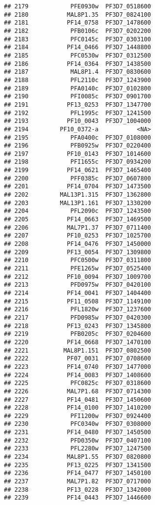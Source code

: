 \documentclass{article}\usepackage[]{graphicx}\usepackage[]{color}
\makeatletter
\newenvironment{kframe}{%
 \def\at@end@of@kframe{}%
 \ifinner\ifhmode%
  \def\at@end@of@kframe{\end{minipage}}%
  \begin{minipage}{\columnwidth}%
 \fi\fi%
 \def\FrameCommand##1{\hskip\@totalleftmargin \hskip-\fboxsep
 \colorbox{shadecolor}{##1}\hskip-\fboxsep
     \hskip-\linewidth \hskip-\@totalleftmargin \hskip\columnwidth}%
 \MakeFramed {\advance\hsize-\width
   \@totalleftmargin\z@ \linewidth\hsize
   \@setminipage}}%
 {\par\unskip\endMakeFramed%
 \at@end@of@kframe}
\newenvironment{knitrout}{}{} %
\makeatother
\begin{document}
\begin{knitrout}
\begin{kframe}
\begin{verbatim}
## 2179            PFE0930w  PF3D7_0518600
## 2180           MAL8P1.35  PF3D7_0824100
## 2181           PF14_0758  PF3D7_1478600
## 2182            PFB0106c  PF3D7_0202200
## 2183            PFC0145c  PF3D7_0303100
## 2184           PF14_0466  PF3D7_1448800
## 2185            PFC0530w  PF3D7_0312500
## 2186           PF14_0364  PF3D7_1438500
## 2187            MAL8P1.4  PF3D7_0830600
## 2188            PFL2110c  PF3D7_1243900
## 2189            PFA0140c  PF3D7_0102800
## 2190            PFI0085c  PF3D7_0901700
## 2191           PF13_0253  PF3D7_1347700
## 2192            PFL1995c  PF3D7_1241500
## 2193           PF10_0043  PF3D7_1004000
## 2194         PF10_0372-a           <NA>
## 2195            PFA0400c  PF3D7_0108000
## 2196            PFB0925w  PF3D7_0220400
## 2197           PF10_0143  PF3D7_1014600
## 2198            PFI1655c  PF3D7_0934200
## 2199           PF14_0621  PF3D7_1465400
## 2200            PFF0385c  PF3D7_0607800
## 2201           PF14_0704  PF3D7_1473500
## 2202         MAL13P1.315  PF3D7_1362800
## 2203         MAL13P1.161  PF3D7_1330200
## 2204            PFL2090c  PF3D7_1243500
## 2205           PF14_0663  PF3D7_1469500
## 2206           MAL7P1.37  PF3D7_0711400
## 2207           PF10_0253  PF3D7_1025700
## 2208           PF14_0476  PF3D7_1450000
## 2209           PF13_0054  PF3D7_1309800
## 2210            PFC0500w  PF3D7_0311800
## 2211            PFE1265w  PF3D7_0525400
## 2212           PF10_0094  PF3D7_1009700
## 2213            PFD0975w  PF3D7_0420100
## 2214           PF14_0041  PF3D7_1404400
## 2215           PF11_0508  PF3D7_1149100
## 2216            PFL1820w  PF3D7_1237600
## 2217            PFD0985w  PF3D7_0420300
## 2218           PF13_0243  PF3D7_1345800
## 2219            PFB0205c  PF3D7_0204600
## 2220           PF14_0668  PF3D7_1470100
## 2221          MAL8P1.151  PF3D7_0802500
## 2222           PF07_0031  PF3D7_0708600
## 2223           PF14_0740  PF3D7_1477000
## 2224           PF14_0083  PF3D7_1408600
## 2225            PFC0825c  PF3D7_0318600
## 2226           MAL7P1.68  PF3D7_0714300
## 2227           PF14_0481  PF3D7_1450600
## 2228           PF14_0100  PF3D7_1410200
## 2229            PFI1200w  PF3D7_0924400
## 2230            PFC0340w  PF3D7_0308000
## 2231           PF14_0480  PF3D7_1450500
## 2232            PFD0350w  PF3D7_0407100
## 2233            PFL2280w  PF3D7_1247500
## 2234           MAL8P1.55  PF3D7_0820800
## 2235           PF13_0225  PF3D7_1341500
## 2236           PF14_0477  PF3D7_1450100
## 2237           MAL7P1.82  PF3D7_0717000
## 2238           PF13_0228  PF3D7_1342000
## 2239           PF14_0443  PF3D7_1446600

\end{verbatim}
\end{kframe}
\end{knitrout}
\end{document}
